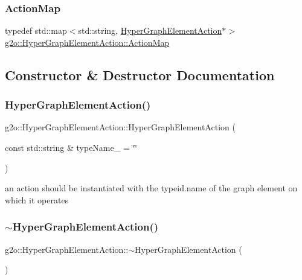 \subsubsection{\texorpdfstring{Action\+Map}{ActionMap}}
{\footnotesize\ttfamily typedef std\+::map$<$std\+::string, \mbox{\hyperlink{classg2o_1_1_hyper_graph_element_action}{Hyper\+Graph\+Element\+Action}}$\ast$$>$ \mbox{\hyperlink{classg2o_1_1_hyper_graph_element_action_abc889fc90ae1bbb63d90c7993777417a}{g2o\+::\+Hyper\+Graph\+Element\+Action\+::\+Action\+Map}}}



\subsection{Constructor \& Destructor Documentation}
\mbox{\label{classg2o_1_1_hyper_graph_element_action_a1230bdd21f7c2b2c71e7206b59d81fd5}} 
\subsubsection{\texorpdfstring{Hyper\+Graph\+Element\+Action()}{HyperGraphElementAction()}}
{\footnotesize\ttfamily g2o\+::\+Hyper\+Graph\+Element\+Action\+::\+Hyper\+Graph\+Element\+Action (\begin{DoxyParamCaption}\item[{const std\+::string \&}]{type\+Name\+\_\+ = {\ttfamily \char`\"{}\char`\"{}} }\end{DoxyParamCaption})}

an action should be instantiated with the typeid.\+name of the graph element on which it operates \mbox{\label{classg2o_1_1_hyper_graph_element_action_a01f7f7f2fb00018f2d0163a611f2f5da}} 
\subsubsection{\texorpdfstring{$\sim$\+Hyper\+Graph\+Element\+Action()}{~HyperGraphElementAction()}}
{\footnotesize\ttfamily g2o\+::\+Hyper\+Graph\+Element\+Action\+::$\sim$\+Hyper\+Graph\+Element\+Action (\begin{DoxyParamCaption}{ }\end{DoxyParamCaption})\hspace{0.3cm}{\ttfamily [virtual]}}



